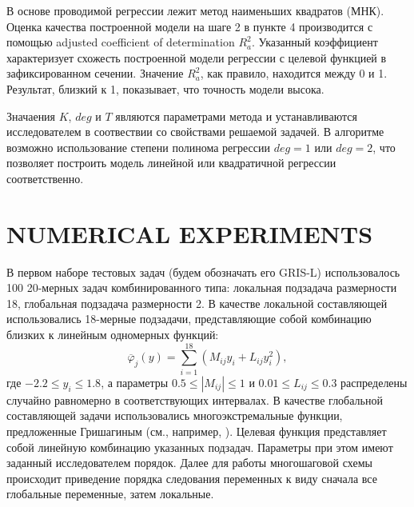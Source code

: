 \documentclass{aip-cp}
\begin{document}
%

В основе проводимой регрессии лежит метод наименьших квадратов (МНК). Оценка качества построенной модели на шаге 2 в пункте 4 производится с помощью adjusted coefficient of determination $R^2_a$. Указанный коэффициент характеризует схожесть построенной модели регрессии с целевой функцией в зафиксированном сечении. Значение $R^2_a$, как правило, находится между 0 и 1. Результат, близкий к 1, показывает, что точность модели высока.

Значаения  $K$, $deg$ и $T$ являются параметрами метода и устанавливаются исследователем в соотвествии со свойствами решаемой задачей. В алгоритме возможно использование степени полинома регрессии $deg = 1$ или $deg = 2$, что позволяет построить модель линейной или квадратичной регрессии соответственно.

\section{NUMERICAL EXPERIMENTS}

В первом наборе тестовых задач (будем обозначать его GRIS-L) использовалось 100 20-мерных задач комбинированного типа: локальная подзадача размерности 18, глобальная подзадача размерности 2. В качестве локальной составляющей использовались 18-мерные подзадачи, представляющие собой комбинацию близких к линейным одномерных функций:
\begin{equation}\label{X2_problem}
\overline{\varphi}_j(y) = \sum_{i=1}^{18} \left(M_{ij} y_i + L_{ij} y_i^2\right) ,
\end{equation}
где $-2.2 \leq y_i \leq 1.8$, а параметры $0.5 \leq |M_{ij}| \leq 1$ и $0.01 \leq L_{ij} \leq 0.3$  распределены случайно равномерно в соответствующих интервалах.
В качестве глобальной составляющей задачи использовались многоэкстремальные функции, предложенные Гришагиным (см., например, \cite{Grishagin1994}).
Целевая функция представляет собой линейную комбинацию указанных подзадач. Параметры при этом имеют заданный исследователем порядок. Далее для работы многошаговой схемы происходит приведение порядка следования переменных к виду сначала все глобальные переменные, затем локальные.
\end{document}
